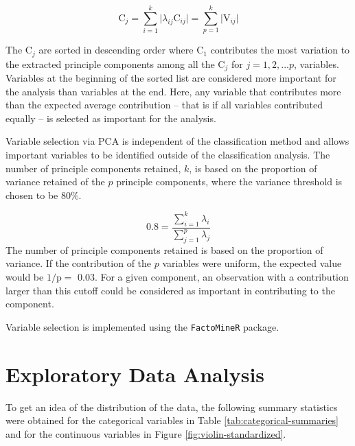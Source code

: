 \documentclass[12pt,]{article}
\begin{document}
\[
\text{C}_j = \sum^k_{i=1} \vert \lambda_{ij} \text{C}_{ij} \vert = \sum^k_{p=1} \vert \text{V}_{ij} \vert 
\]

The \(\text{C}_j\) are sorted in descending order where \(\text{C}_1\)
contributes the most variation to the extracted principle components
among all the \(\text{C}_j\) for \(j=1,2,...p\), variables. Variables at
the beginning of the sorted list are considered more important for the
analysis than variables at the end. Here, any variable that contributes
more than the expected average contribution -- that is if all variables
contributed equally -- is selected as important for the analysis.

Variable selection via PCA is independent of the classification method
and allows important variables to be identified outside of the
classification analysis. The number of principle components retained,
\(k\), is based on the proportion of variance retained of the \(p\)
principle components, where the variance threshold is chosen to be 80\%.

\[
0.8 = \frac{\sum^k_{i=1} \lambda_i}{\sum^p_{j=1} \lambda_j}
\] The number of principle components retained is based on the
proportion of variance. If the contribution of the \(p\) variables were
uniform, the expected value would be \(1/\text{p} =\) 0.03. For a given
component, an observation with a contribution larger than this cutoff
could be considered as important in contributing to the component.

Variable selection is implemented using the \texttt{FactoMineR} package.

\newpage

\section{Exploratory Data Analysis}\label{exploratory-data-analysis}

To get an idea of the distribution of the data, the following summary
statistics were obtained for the categorical variables in Table
\ref{tab:categorical-summaries} and for the continuous variables in
Figure \ref{fig:violin-standardized}.
\end{document}
